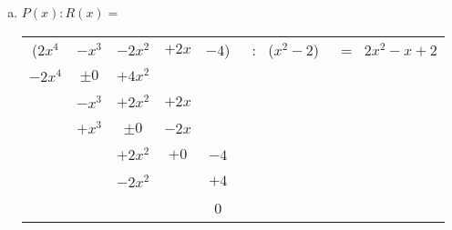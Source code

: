 \documentclass[10pt,ngerman]{scrartcl}
\begin{document}
\begin{enumerate}[1.]
\begin{enumerate}[(a)]
    \item \begin{math} 
P(x) : R(x) =\end{math}\newline~\newline
\begin{tabular}{ccccccc}
    (\begin{math}2x^4\end{math} & \begin{math}-x^3\end{math} & \begin{math}-2x^2\end{math} & \begin{math}+2x\end{math} & \begin{math}-4\end{math}) & ~:~ (\begin{math}x^2-2\end{math}) & ~=~ \begin{math}2x^2 - x + 2\end{math} \\ 
    \begin{math}-2x^4\end{math} & \begin{math}\pm 0\end{math} & \begin{math}+4x^2\end{math} & ~ & ~ & ~ & ~ \\ \toprule
    ~ & \begin{math}-x^3\end{math} & \begin{math}+2x^2\end{math} & \begin{math}+2x\end{math} & ~ & ~ & ~ \\
    ~ & \begin{math}+x^3\end{math} & \begin{math}\pm 0\end{math} & \begin{math}-2x\end{math} & ~ & ~ & ~ \\ \toprule
    ~ & ~ & \begin{math}+2x^2\end{math} & \begin{math}+0\end{math} &  \begin{math}-4\end{math} & ~ & ~ \\
    ~ & ~ & \begin{math}-2x^2\end{math} & ~ & \begin{math}+4\end{math} & ~ & ~ \\ \toprule
    ~ & ~ & ~ & ~ & 0 & ~ & ~ 
\end{tabular}
\end{enumerate}
	

\end{enumerate}
\end{document}

